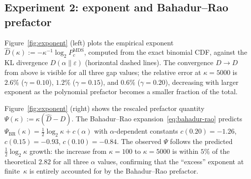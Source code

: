 \documentclass[journal]{IEEEtran}
\numberwithin{equation}{section}
\begin{document}
\subsection{Experiment 2: exponent and Bahadur--Rao prefactor}
\label{subsec:exp-exponent-fig}

Figure~\ref{fig:exponent} (left) plots the empirical exponent
\(\hat D(\kappa):=-\kappa^{-1}\log_2 P_c^{\mathrm{MDS}}\),
computed from the exact binomial CDF, against the KL divergence
\(D(\alpha\|\varepsilon)\) (horizontal dashed lines).
The convergence \(\hat D\to D\) from above is visible for all
three gap values; the relative error at \(\kappa=5000\) is
\(2.6\%\) (\(\gamma=0.10\)), \(1.2\%\) (\(\gamma=0.15\)), and
\(0.6\%\) (\(\gamma=0.20\)), decreasing with larger exponent as
the polynomial prefactor becomes a smaller fraction of the total.

Figure~\ref{fig:exponent} (right) shows the rescaled prefactor
quantity
\(\Psi(\kappa):=\kappa(\hat D-D)\).
The Bahadur--Rao expansion~\eqref{eq:bahadur-rao} predicts
\(\Psi_{\mathrm{BR}}(\kappa)
=\tfrac{1}{2}\log_2\kappa+c(\alpha)\)
with \(\alpha\)-dependent constants \(c(0.20)=-1.26\),
\(c(0.15)=-0.93\), \(c(0.10)=-0.84\).
The observed \(\Psi\) follows the predicted
\(\tfrac{1}{2}\log_2\kappa\) growth: the increase from
\(\kappa=100\) to \(\kappa=5000\) is within \(5\%\) of the
theoretical \(2.82\) for all three \(\alpha\) values, confirming
that the ``excess'' exponent at finite~\(\kappa\) is entirely
accounted for by the Bahadur--Rao prefactor.
\end{document}
